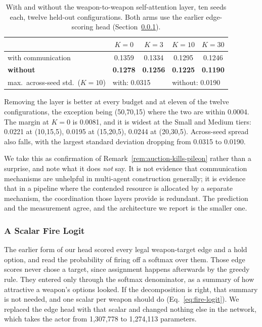 \begin{table}[t]
\centering
\small
\caption{With and without the weapon-to-weapon self-attention layer, ten seeds
each, twelve held-out configurations. Both arms use the earlier edge-scoring
head (Section~\ref{sec:firelogit-ablation}).}
\label{tab:comm-ablation}
\begin{tabular}{@{}lcccc@{}}
\toprule
& $K{=}0$ & $K{=}3$ & $K{=}10$ & $K{=}30$ \\
\midrule
with communication & 0.1359 & 0.1334 & 0.1295 & 0.1246 \\
\textbf{without} & \textbf{0.1278} & \textbf{0.1256} & \textbf{0.1225} & \textbf{0.1190} \\
\midrule
max.\ across-seed std.\ ($K{=}10$) & \multicolumn{2}{l}{with: 0.0315} & \multicolumn{2}{l}{without: 0.0190} \\
\bottomrule
\end{tabular}
\end{table}

Removing the layer is better at every budget and at eleven of the twelve
configurations, the exception being (50,70,15) where the two are within 0.0004.
The margin at $K{=}0$ is 0.0081, and it is widest at the Small and Medium tiers:
0.0221 at (10,15,5), 0.0195 at (15,20,5), 0.0244 at (20,30,5). Across-seed
spread also falls, with the largest standard deviation dropping from 0.0315 to
0.0190.

We take this as confirmation of Remark~\ref{rem:auction-kills-pileon} rather
than a surprise, and note what it does \emph{not} say. It is not evidence that
communication mechanisms are unhelpful in multi-agent construction generally;
it is evidence that in a pipeline where the contended resource is allocated by
a separate mechanism, the coordination those layers provide is redundant. The
prediction and the measurement agree, and the architecture we report is the
smaller one.

\subsubsection{A Scalar Fire Logit}
\label{sec:firelogit-ablation}

The earlier form of our head scored every legal weapon-target edge and a hold
option, and read the probability of firing off a softmax over them. Those edge
scores never chose a target, since assignment happens afterwards by the greedy
rule. They entered only through the softmax denominator, as a summary of how
attractive a weapon's options looked. If the decomposition is right, that
summary is not needed, and one scalar per weapon should do
(Eq.~\eqref{eq:fire-logit}). We replaced the edge head with that scalar and
changed nothing else in the network, which takes the actor from 1{,}307{,}778
to 1{,}274{,}113 parameters.

